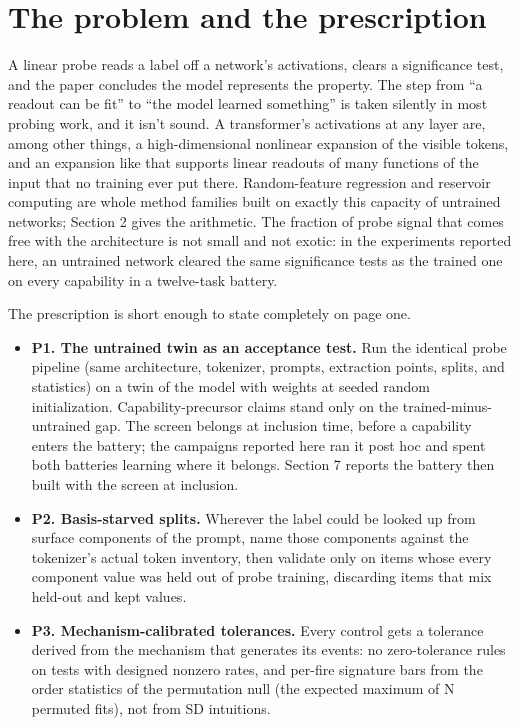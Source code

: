 \section{The problem and the prescription}\label{the-problem-and-the-prescription}

A linear probe reads a label off a network's activations, clears a
significance test, and the paper concludes the model represents the
property. The step from ``a readout can be fit'' to ``the model learned
something'' is taken silently in most probing work, and it isn't sound.
A transformer's activations at any layer are, among other things, a
high-dimensional nonlinear expansion of the visible tokens, and an
expansion like that supports linear readouts of many functions of the
input that no training ever put there. Random-feature regression and
reservoir computing are whole method families built on exactly this
capacity of untrained networks; Section 2 gives the arithmetic. The
fraction of probe signal that comes free with the architecture is not
small and not exotic: in the experiments reported here, an untrained
network cleared the same significance tests as the trained one on
every capability in a twelve-task battery.

The prescription is short enough to state completely on page one.

\begin{itemize}
\tightlist
\item
  \textbf{P1. The untrained twin as an acceptance test.} Run the identical
  probe pipeline (same architecture, tokenizer, prompts, extraction
  points, splits, and statistics) on a twin of the model with weights
  at seeded random initialization. Capability-precursor claims stand
  only on the trained-minus-untrained gap. The screen belongs at
  inclusion time, before a capability enters the battery; the
  campaigns reported here ran it post hoc and spent both batteries
  learning where it belongs. Section 7 reports the battery then
  built with the screen at inclusion.
\item
  \textbf{P2. Basis-starved splits.} Wherever the label could be looked up
  from surface components of the prompt, name those components against
  the tokenizer's actual token inventory, then validate only on items
  whose every component value was held out of probe training,
  discarding items that mix held-out and kept values.
\item
  \textbf{P3. Mechanism-calibrated tolerances.} Every control gets a
  tolerance derived from the mechanism that generates its events: no
  zero-tolerance rules on tests with designed nonzero rates, and
  per-fire signature bars from the order statistics of the permutation
  null (the expected maximum of N permuted fits), not from SD
  intuitions.
\end{itemize}

